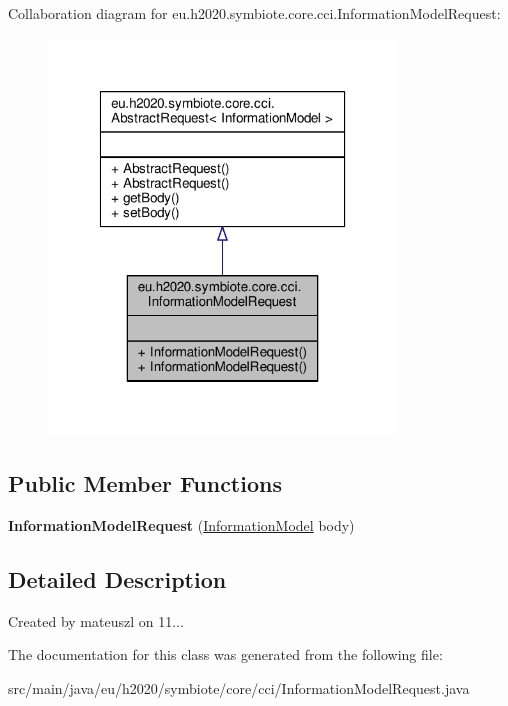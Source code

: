 Collaboration diagram for eu.\+h2020.\+symbiote.\+core.\+cci.\+Information\+Model\+Request\+:\nopagebreak
\begin{figure}[H]
\begin{center}
\leavevmode
\includegraphics[width=262pt]{classeu_1_1h2020_1_1symbiote_1_1core_1_1cci_1_1InformationModelRequest__coll__graph}
\end{center}
\end{figure}
\subsection*{Public Member Functions}
\begin{DoxyCompactItemize}
\item 
\mbox{\label{classeu_1_1h2020_1_1symbiote_1_1core_1_1cci_1_1InformationModelRequest_aa961d62ac6990fbeb92c159a175feb70}} 
{\bfseries Information\+Model\+Request} (\hyperlink{classeu_1_1h2020_1_1symbiote_1_1model_1_1mim_1_1InformationModel}{Information\+Model} body)
\end{DoxyCompactItemize}


\subsection{Detailed Description}
Created by mateuszl on 11... 

The documentation for this class was generated from the following file\+:\begin{DoxyCompactItemize}
\item 
src/main/java/eu/h2020/symbiote/core/cci/Information\+Model\+Request.\+java\end{DoxyCompactItemize}
